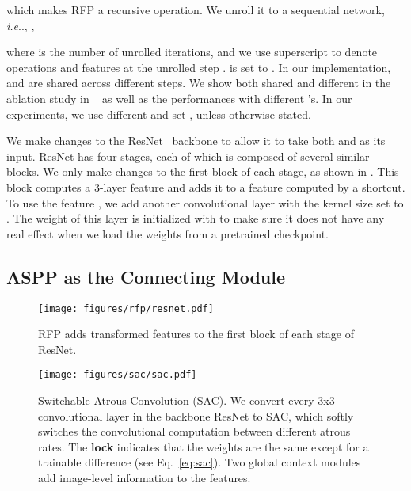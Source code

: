 \documentclass[final]{cvpr}
\makeatletter
\def\@onedot{\ifx\@let@token.\else.\null\fi\xspace}
\DeclareRobustCommand\onedot{\futurelet\@let@token\@onedot}
\def\ie{\emph{i.e}\onedot} \def\Ie{\emph{I.e}\onedot}
\makeatother
\begin{document}
which makes RFP a recursive operation.
We unroll it to a sequential network, \ie,
,

where  is the number of unrolled iterations, and we use superscript  to denote operations and features at the unrolled step .
 is set to . 
In our implementation,  and  are shared across different steps.
We show both shared and different  in the ablation study in ~ as well as the performances with different 's.
In our experiments, we use different  and set , unless otherwise stated.

We make changes to the ResNet~\cite{resnet} backbone  to allow it to take both  and  as its input.
ResNet has four stages, each of which is composed of several similar blocks.
We only make changes to the first block of each stage, as shown in .
This block computes a 3-layer feature and adds it to a feature computed by a shortcut.
To use the feature , we add another convolutional layer with the kernel size set to .
The weight of this layer is initialized with  to make sure it does not have any real effect when we load the weights from a pretrained checkpoint.

\subsection{ASPP as the Connecting Module}

\begin{figure}[!htp]
    \centering
    \texttt{[image: figures/rfp/resnet.pdf]}
    \caption{RFP adds transformed features to the first block of each stage of ResNet.}
    \label{fig:resnet}
\end{figure}

\begin{figure*}
    \centering
    \texttt{[image: figures/sac/sac.pdf]}
    \caption{Switchable Atrous Convolution (SAC).
    We convert every 3x3 convolutional layer in the backbone ResNet to SAC, which softly switches the convolutional computation between different atrous rates.
    The \textbf{lock} indicates that the weights are the same except for a trainable difference (see Eq.~\ref{eq:sac}).
    Two global context modules add image-level information to the features. 
    }
    \label{fig:sac}
\end{figure*}
\end{document}
